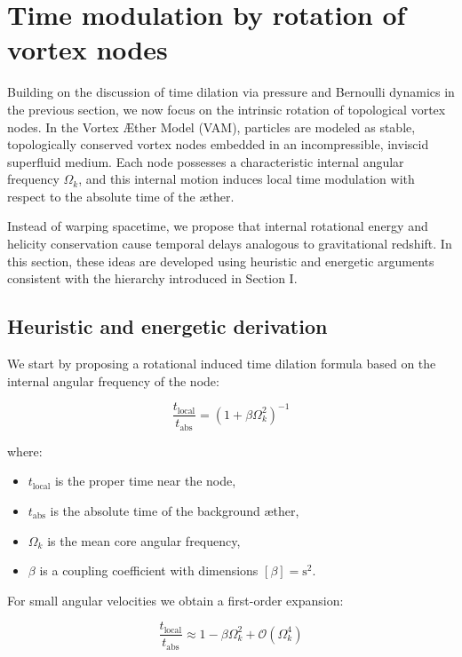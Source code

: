 \section{Time modulation by rotation of vortex nodes}

Building on the discussion of time dilation via pressure and Bernoulli dynamics in the previous section, we now focus on the intrinsic rotation of topological vortex nodes. In the Vortex Æther Model (VAM), particles are modeled as stable, topologically conserved vortex nodes embedded in an incompressible, inviscid superfluid medium. Each node possesses a characteristic internal angular frequency $\Omega_k$, and this internal motion induces local time modulation with respect to the absolute time of the æther.

Instead of warping spacetime, we propose that internal rotational energy and helicity conservation cause temporal delays analogous to gravitational redshift. In this section, these ideas are developed using heuristic and energetic arguments consistent with the hierarchy introduced in Section I.

\subsection{Heuristic and energetic derivation}

We start by proposing a rotational induced time dilation formula based on the internal angular frequency of the node:

\begin{equation}
    \frac{t_{\text{local}}}{t_{\text{abs}}} = \left(1 + \beta \Omega_k^2 \right)^{-1}\label{eq:rotational_induced_time_dilation}
\end{equation}

where:

\begin{itemize}
    \item $t_{\text{local}}$ is the proper time near the node,
    \item $t_{\text{abs}}$ is the absolute time of the background æther,
    \item $\Omega_k$ is the mean core angular frequency,
    \item $\beta$ is a coupling coefficient with dimensions $[\beta] = \text{s}^2$.
\end{itemize}

For small angular velocities we obtain a first-order expansion:

\begin{equation}
    \frac{t_{\text{local}}}{t_{\text{abs}}} \approx 1 - \beta \Omega_k^2 + \mathcal{O}(\Omega_k^4)\label{eq:rotational_induced_time_dilation_expansion}
\end{equation}

